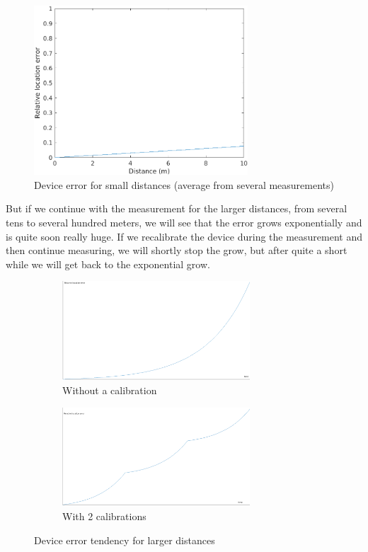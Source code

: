 \documentclass[hidelinks,a4paper]{article}
\begin{document}
\begin{figure}[h]
    \centering
    \includegraphics[width=8cm]{img/smallDistanceError.png}
    \caption{Device error for small distances (average from several measurements)}
\end{figure}

But if we continue with the measurement for the larger distances, from several tens to several hundred meters, we will see that the error grows exponentially and is quite soon really huge. If we recalibrate the device during the measurement and then continue measuring, we will shortly stop the grow, but after quite a short while we will get back to the exponential grow.\par
\begin{figure}[h]
  \begin{subfigure}{7.5cm}
    \includegraphics[width=7cm]{img/largeDistanceError.png}
    \caption{Without a calibration}
  \end{subfigure}
  \begin{subfigure}{7cm}
    \includegraphics[width=7cm]{img/calibrationError.png}
    \caption{With 2 calibrations}
  \end{subfigure}
  \caption[Caption for LOF]{Device error tendency for larger distances\footnotemark}
\end{figure}
\end{document}
